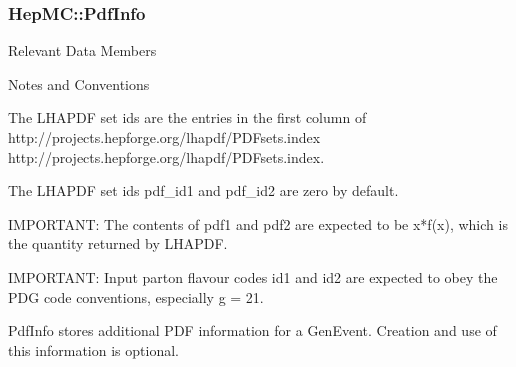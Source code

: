 \documentclass[11pt,letterpaper]{article}
\begin{document}
%
%

\subsubsection{HepMC::PdfInfo}
\begin{myitemize}{Relevant Data Members}
\end{myitemize}
\begin{myitemize}{Notes and Conventions}
  \item The LHAPDF\cite{lhapdf} set ids are the entries in the first column of
	\htmladdnormallink
	{http://projects.hepforge.org/lhapdf/PDFsets.index}
	{http://projects.hepforge.org/lhapdf/PDFsets.index}.
  \item The LHAPDF set ids pdf\_id1 and pdf\_id2 are zero by default.
  \item IMPORTANT: The contents of pdf1 and pdf2 are expected to be x*f(x), 
        which is the quantity returned by LHAPDF.
  \item IMPORTANT: Input parton flavour codes id1 and id2 are expected to 
        obey the PDG code conventions, especially g = 21. 
\end{myitemize}

PdfInfo stores additional PDF information for a GenEvent.
Creation and use of this information is optional. 

%
%
\end{document}
